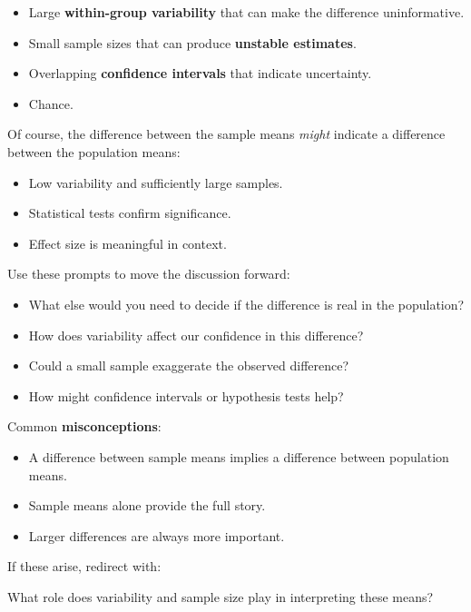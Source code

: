 \documentclass[
  11pt,
  a4paper,
  krantz2]{krantz}
\makeatletter
\providecommand{\tightlist}{%
  \setlength{\itemsep}{0pt}\setlength{\parskip}{0pt}}
\renewenvironment{quote}%
{\begin{kframe}}
{\end{kframe}}
\newenvironment{kframe}{%
\medskip{}
\setlength{\fboxsep}{.8em}
 \def\at@end@of@kframe{}%
 \ifinner\ifhmode%
  \def\at@end@of@kframe{\end{minipage}}%
  \begin{minipage}{\columnwidth}%
 \fi\fi%
 \def\FrameCommand##1{\hskip\@totalleftmargin \hskip-\fboxsep
 \colorbox{shadecolor}{##1}\hskip-\fboxsep
     \hskip-\linewidth \hskip-\@totalleftmargin \hskip\columnwidth}%
 \MakeFramed {\advance\hsize-\width
   \@totalleftmargin\z@ \linewidth\hsize
   \@setminipage}}%
 {\par\unskip\endMakeFramed%
 \at@end@of@kframe}
\renewenvironment{quote}
               {\list{}{\vspace{-0.5em}\begin{kframe}\small%
                        \rightmargin   \leftmargin
                        \parsep        \z@ \@plus\p@}%
                \item\relax}
               {\end{kframe}\endlist}
\makeatother
\begin{document}
\begin{itemize}
\tightlist
\item
  Large \textbf{within-group variability} that can make the difference uninformative.
\item
  Small sample sizes that can produce \textbf{unstable estimates}.
\item
  Overlapping \textbf{confidence intervals} that indicate uncertainty.
\item
  Chance.
\end{itemize}

Of course, the difference between the sample means \emph{might} indicate a difference between the population means:

\begin{itemize}
\tightlist
\item
  Low variability and sufficiently large samples.
\item
  Statistical tests confirm significance.
\item
  Effect size is meaningful in context.
\end{itemize}

Use these prompts to move the discussion forward:

\begin{itemize}
\tightlist
\item
  What else would you need to decide if the difference is real in the population?
\item
  How does variability affect our confidence in this difference?
\item
  Could a small sample exaggerate the observed difference?
\item
  How might confidence intervals or hypothesis tests help?
\end{itemize}

Common \textbf{misconceptions}:

\begin{itemize}
\tightlist
\item
  A difference between sample means implies a difference between population means.
\item
  Sample means alone provide the full story.
\item
  Larger differences are always more important.
\end{itemize}

If these arise, redirect with:

\begin{quote}
What role does variability and sample size play in interpreting these means?
\end{quote}
\end{document}
